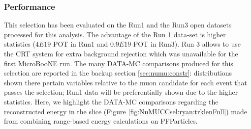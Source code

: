 \subsubsection{Performance}
\label{sssec:NuMUCCsel:constr:performance}

\par This selection has been evaluated on the Run1 and the Run3 open datasets processed for this analysis. The advantage of the Run 1 data-set is higher statistics ($4E19$ POT in Run1 and $0.9E19$ POT in Run3). Run 3 allows to use the CRT system for extra background rejection which was unavailable for the first MicroBooNE run. 
The many DATA-MC comparisons produced for this selection are reported in the backup section \ref{sec:numu:constr}: distributions shown there pertain  variables relative to the muon candidate for each event that passes the selection; Run1 data will be preferentially shown due to the higher statistics. Here, we highlight the DATA-MC comparisons regarding the reconstructed energy in the slice (Figure \ref{fig:NuMUCCsel:ryan:trklenFull}) made from combining range-based energy calculations on PFParticles.

